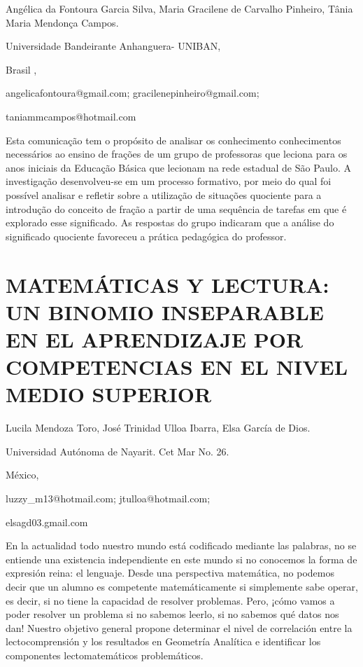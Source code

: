 \begin{datos}

Angélica da Fontoura Garcia Silva, Maria Gracilene de Carvalho Pinheiro,
Tânia Maria Mendonça Campos.

Universidade Bandeirante Anhanguera- UNIBAN,

Brasil ,

angelicafontoura@gmail.com; gracilenepinheiro@gmail.com;

taniammcampos@hotmail.com 

\end{datos}

Esta comunicação tem o propósito de analisar os conhecimento conhecimentos
necessários ao ensino de frações de um grupo de professoras que leciona
para os anos iniciais da Educação Básica que lecionam na rede estadual
de São Paulo. A investigação desenvolveu-se em um processo formativo,
por meio do qual foi possível analisar e refletir sobre a utilização
de situações quociente para a introdução do conceito de fração a partir
de uma sequência de tarefas em que é explorado esse significado. As
respostas do grupo indicaram que a análise do significado quociente
favoreceu a prática pedagógica do professor.


\section{MATEMÁTICAS Y LECTURA: UN BINOMIO INSEPARABLE EN EL APRENDIZAJE POR
COMPETENCIAS EN EL NIVEL MEDIO SUPERIOR}

\begin{datos}

Lucila Mendoza Toro, José Trinidad Ulloa Ibarra, Elsa García de Dios.

Universidad Autónoma de Nayarit. Cet Mar No. 26. 

México,

luzzy\_m13@hotmail.com; jtulloa@hotmail.com;

elsagd03.gmail.com 

\end{datos}

En la actualidad todo nuestro mundo está codificado mediante las palabras,
no se entiende una existencia independiente en este mundo si no conocemos
la forma de expresión reina: el lenguaje. Desde una perspectiva matemática,
no podemos decir que un alumno es competente matemáticamente si simplemente
sabe operar, es decir, si no tiene la capacidad de resolver problemas.
Pero, ¡cómo vamos a poder resolver un problema si no sabemos leerlo,
si no sabemos qué datos nos dan! Nuestro objetivo general propone
determinar el nivel de correlación entre la lectocomprensión y los
resultados en Geometría Analítica e identificar los componentes lectomatemáticos
problemáticos.



